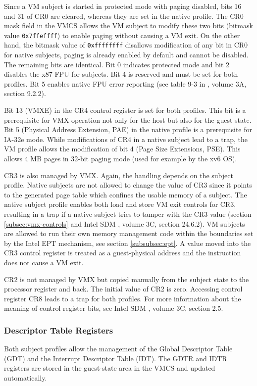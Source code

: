 Since a VM subject is started in protected mode with paging disabled, bits 16
and 31 of CR0 are cleared, whereas they are set in the native profile. The CR0
mask field in the VMCS allows the VM subject to modify these two bits (bitmask
value \texttt{0x7ffeffff}) to enable paging without causing a VM exit. On the
other hand, the bitmask value of \texttt{0xffffffff} disallows modification of
any bit in CR0 for native subjects, paging is already enabled by default and
cannot be disabled. The remaining bits are identical. Bit 0 indicates protected
mode and bit 2 disables the x87 FPU for subjects. Bit 4 is reserved and must be
set for both profiles. Bit 5 enables native FPU error reporting (see table 9-3
in \cite{IntelSDM}, volume 3A, section 9.2.2).

Bit 13 (VMXE) in the CR4 control register is set for both profiles. This bit is
a prerequisite for VMX operation not only for the host but also for the guest
state. Bit 5 (Physical Address Extension, PAE) in the native profile
is a prerequisite for IA-32e mode. While modifications of CR4 in a native
subject lead to a trap, the VM profile allows the modification of bit 4 (Page
Size Extensions, PSE). This allows 4 MB pages in 32-bit paging mode
(used for example by the xv6 OS).

CR3 is also managed by VMX. Again, the handling depends on the subject profile.
Native subjects are not allowed to change the value of CR3 since it points to
the generated page table which confines the usable memory of a subject. The
native subject profile enables both load and store VM exit controls for CR3,
resulting in a trap if a native subject tries to tamper with the CR3 value
(section \ref{subsec:vmx-controls} and Intel SDM \cite{IntelSDM}, volume 3C,
section 24.6.2). VM subjects are allowed to run their own memory management
code within the boundaries set by the Intel EPT mechanism, see section
\ref{subsubsec:ept}. A value moved into the CR3 control register is treated as
a guest-physical address and the instruction does not cause a VM exit.

CR2 is not managed by VMX but copied manually from the subject state to the
processor register and back. The initial value of CR2 is zero. Accessing
control register CR8 leads to a trap for both profiles. For more information
about the meaning of control register bits, see Intel SDM \cite{IntelSDM},
volume 3C, section 2.5.

\subsubsection{Descriptor Table Registers}
Both subject profiles allow the management of the Global Descriptor Table
(GDT) and the Interrupt Descriptor Table (IDT). The GDTR
and IDTR registers are stored in the guest-state area in the VMCS and updated
automatically.

